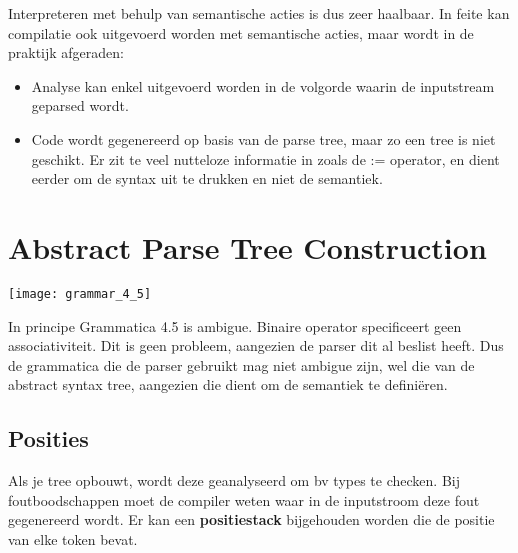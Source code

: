 Interpreteren met behulp van semantische acties is dus zeer haalbaar. In feite kan compilatie ook uitgevoerd worden met semantische acties, maar wordt in de praktijk afgeraden:
\begin{itemize}
	\item Analyse kan enkel uitgevoerd worden in de volgorde waarin de inputstream geparsed wordt. 
	\item Code wordt gegenereerd op basis van de parse tree, maar zo een tree is niet geschikt. Er zit te veel nutteloze informatie in zoals de := operator, en dient eerder om de syntax uit te drukken en niet de semantiek.
\end{itemize}

\section{Abstract Parse Tree Construction}
\begin{grammarfigure}[h]
	\texttt{[image: grammar\_4\_5]}
	\caption{}
	\label{fig:grammar_4_5}
\end{grammarfigure}
In principe 
Grammatica 4.5 is ambigue. Binaire operator specificeert geen associativiteit. Dit is geen probleem, aangezien de parser dit al beslist heeft. Dus de grammatica die de parser gebruikt mag niet ambigue zijn, wel die van de abstract syntax tree, aangezien die dient om de semantiek te definiëren.
\subsection{Posities}
Als je tree opbouwt, wordt deze geanalyseerd om bv types te checken. Bij foutboodschappen moet de compiler weten waar in de inputstroom deze fout gegenereerd wordt. Er kan een \textbf{positiestack} bijgehouden worden die de positie van elke token bevat.